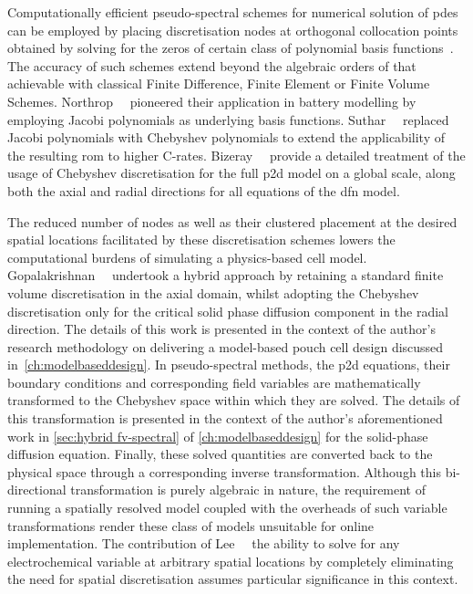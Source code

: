 Computationally  efficient pseudo-spectral  schemes  for  numerical solution  of
\glspl{pde}  can  be employed  by  placing  discretisation nodes  at  orthogonal
collocation  points obtained  by  solving  for the  zeros  of  certain class  of
polynomial basis
functions~\cite{Ferguson1971,Trefethen2000,Boyd2001,Shizgal2015,Dutykh2016}.
The  accuracy  of such  schemes  extend  beyond  the  algebraic orders  of  that
achievable with  classical Finite  Difference, Finite  Element or  Finite Volume
Schemes.  Northrop~\etal{}~\cite{Northrop2011}  pioneered their  application  in
battery modelling by employing Jacobi polynomials as underlying basis functions.
Suthar~\etal{}~\cite{Suthar2014}  replaced  Jacobi  polynomials  with  Chebyshev
polynomials to  extend the  applicability of the  resulting \gls{rom}  to higher
C-rates. Bizeray~\etal{}~\cite{Bizeray2015} provide a  detailed treatment of the
usage  of Chebyshev  discretisation for  the full  \gls{p2d} model  on a  global
scale, \ie{} along both the axial and radial directions for all equations of the
\gls{dfn} model.


The  reduced  number   of  nodes  as  well  as  their   clustered  placement  at
the  desired  spatial  locations  facilitated by  these  discretisation  schemes
lowers  the computational  burdens  of simulating  a  physics-based cell  model.
Gopalakrishnan~\etal{}~\cite{Gopalakrishnan2018} undertook a  hybrid approach by
retaining a  standard finite volume  discretisation in the axial  domain, whilst
adopting  the  Chebyshev  discretisation  only  for  the  critical  solid  phase
diffusion  component in  the  radial  direction. The  details  of  this work  is
presented  in the  context of  the author's  research methodology  on delivering
a  model-based pouch  cell  design  discussed in~\cref{ch:modelbaseddesign}.  In
pseudo-spectral methods, the \gls{p2d}  equations, their boundary conditions and
corresponding field  variables are  mathematically transformed to  the Chebyshev
space  within  which  they  are  solved.  The  details  of  this  transformation
is  presented   in  the   context  of  the   author's  aforementioned   work  in
\cref{sec:hybrid fv-spectral} of  \cref{ch:modelbaseddesign} for the solid-phase
diffusion equation. Finally,  these solved quantities are converted  back to the
physical  space through  a corresponding  inverse transformation.  Although this
bi-directional  transformation is  purely algebraic  in nature,  the requirement
of  running a  spatially  resolved  model coupled  with  the  overheads of  such
variable  transformations render  these class  of models  unsuitable for  online
implementation. The contribution  of Lee~\etal~\cite{Lee2012a,Lee2012} \ie{} the
ability to solve for any electrochemical variable at arbitrary spatial locations
by completely eliminating the need for spatial discretisation assumes particular
significance in this context.


